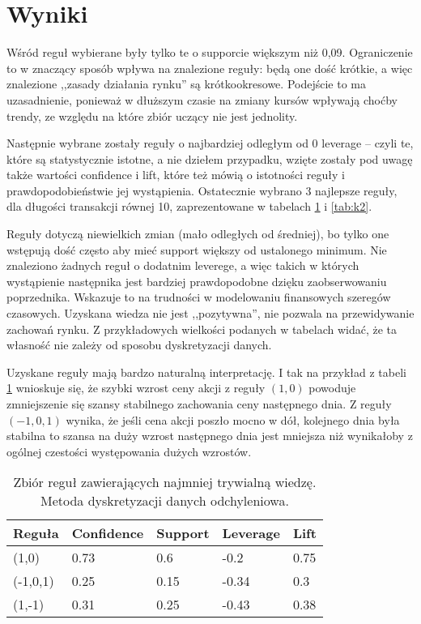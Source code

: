 \documentclass[a4paper,10pt]{article}
\begin{document}
\section{Wyniki}
Wśród reguł wybierane były tylko te o supporcie większym niż 0,09. Ograniczenie to w znaczący sposób wpływa na znalezione reguły: będą one dość krótkie, 
a więc znalezione ,,zasady działania rynku'' są krótkookresowe. Podejście to ma uzasadnienie, ponieważ w dłuższym czasie na zmiany kursów wpływają 
choćby trendy, ze względu na które zbiór uczący nie jest jednolity.

Następnie wybrane zostały reguły o najbardziej odległym od 0 leverage – czyli te, które są statystycznie istotne, a nie dziełem przypadku, 
wzięte zostały pod uwagę także wartości confidence i lift, które też mówią o istotności reguły i prawdopodobieństwie jej wystąpienia. 
Ostatecznie wybrano 3 najlepsze reguły, dla długości transakcji równej 10, zaprezentowane w tabelach \ref{tab:k1} i \ref{tab:k2}.

Reguły dotyczą niewielkich zmian (mało odległych od średniej), bo tylko one wstępują dość często aby mieć support większy od ustalonego minimum.
Nie znaleziono żadnych reguł o dodatnim leverege, a więc takich w których wystąpienie następnika jest bardziej prawdopodobne dzięku zaobserwowaniu poprzednika. Wskazuje to na trudności w modelowaniu finansowych szeregów czasowych. Uzyskana wiedza nie jest ,,pozytywna'', nie pozwala na przewidywanie zachowań rynku. Z przykładowych wielkości podanych w tabelach widać, że ta własność nie zależy od sposobu dyskretyzacji danych.

Uzyskane reguły mają bardzo naturalną interpretację. I tak na przykład z tabeli \ref{tab:k1} wnioskuje się, że szybki wzrost ceny akcji z reguły $(1,0)$ powoduje zmniejszenie się szansy stabilnego zachowania ceny następnego dnia. Z reguły $(-1,0,1)$ wynika, że jeśli cena akcji poszło mocno w dół, kolejnego dnia była stabilna
to szansa na duży wzrost następnego dnia jest mniejsza niż wynikałoby z ogólnej czestości występowania dużych wzrostów.

\begin{center}
\begin{table}
\centering
\caption{Zbiór reguł zawierających najmniej trywialną wiedzę. Metoda dyskretyzacji danych odchyleniowa.}
\begin{tabular}{|l|l|l|l|l|} 
\hline
\bf{Reguła} & \bf{Confidence} & \bf{Support} & \bf{Leverage} & \bf{Lift} \\ \hline
(1,0) & 0.73 & 0.6 & -0.2 & 0.75 \\ \hline
(-1,0,1) & 0.25 & 0.15 & -0.34 & 0.3 \\ \hline
(1,-1) & 0.31 & 0.25 & -0.43 & 0.38 \\ \hline
\end{tabular}
\label{tab:k1}
\end{table}
\end{center}
\end{document}
